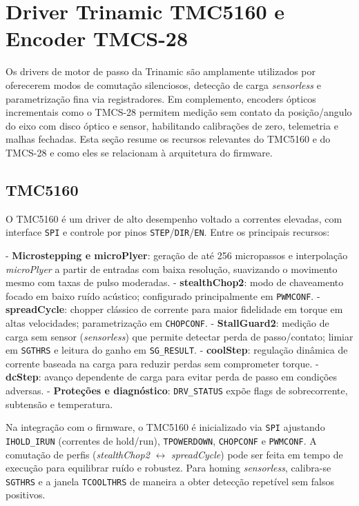 \section{Driver Trinamic TMC5160 e Encoder TMCS-28}

Os drivers de motor de passo da Trinamic s\~ao amplamente utilizados por
oferecerem modos de comuta\c{c}\~ao silenciosos, detec\c{c}\~ao de carga
\emph{sensorless} e parametriza\c{c}\~ao fina via registradores. Em
complemento, encoders \'{o}pticos incrementais como o TMCS-28 permitem
medi\c{c}\~ao sem contato da posi\c{c}\~ao/angulo do eixo com disco \'{o}ptico e
sensor, habilitando calibra\c{c}\~oes de zero, telemetria e malhas fechadas.
Esta se\c{c}\~ao resume os recursos relevantes do TMC5160 e do TMCS-28 e como
eles se relacionam \`a arquitetura do firmware.

\subsection{TMC5160}

O TMC5160 \'e um driver de alto desempenho voltado a correntes elevadas,
com interface \texttt{SPI} e controle por pinos \texttt{STEP}/\texttt{DIR}/\texttt{EN}.
Entre os principais recursos:

- \textbf{Microstepping e microPlyer}: gera\c{c}\~ao de at\'e 256 micropassos e
  interpola\c{c}\~ao \textit{microPlyer} a partir de entradas com baixa
  resolu\c{c}\~ao, suavizando o movimento mesmo com taxas de pulso moderadas.
- \textbf{stealthChop2}: modo de chaveamento focado em baixo ru\'ido
  ac\'ustico; configurado principalmente em \texttt{PWMCONF}.
- \textbf{spreadCycle}: chopper cl\'assico de corrente para maior fidelidade
  em torque em altas velocidades; parametriza\c{c}\~ao em \texttt{CHOPCONF}.
- \textbf{StallGuard2}: medi\c{c}\~ao de carga sem sensor (\emph{sensorless}) que
  permite detectar perda de passo/contato; limiar em \texttt{SGTHRS} e leitura
  do ganho em \texttt{SG\_RESULT}.
- \textbf{coolStep}: regula\c{c}\~ao din\^amica de corrente baseada na carga para
  reduzir perdas sem comprometer torque.
- \textbf{dcStep}: avan\c{c}o dependente de carga para evitar perda de passo
  em condi\c{c}\~oes adversas.
- \textbf{Prote\c{c}\~oes e diagn\'ostico}: \texttt{DRV\_STATUS} exp\~oe flags de
  sobrecorrente, subtens\~ao e temperatura.

Na integra\c{c}\~ao com o firmware, o TMC5160 \'e inicializado via \texttt{SPI}
ajustando \texttt{IHOLD\_IRUN} (correntes de hold/run), \texttt{TPOWERDOWN},
\texttt{CHOPCONF} e \texttt{PWMCONF}. A comuta\c{c}\~ao de perfis (\textit{stealthChop2}
\(\leftrightarrow\) \textit{spreadCycle}) pode ser feita em tempo de execu\c{c}\~ao
para equilibrar ru\'ido e robustez. Para homing \emph{sensorless}, calibra-se
\texttt{SGTHRS} e a janela \texttt{TCOOLTHRS} de maneira a obter detec\c{c}\~ao
repet\'ivel sem falsos positivos.

